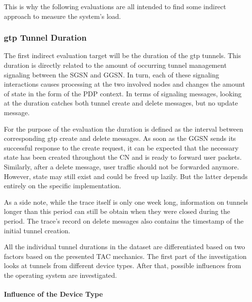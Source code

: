 This is why the following evaluations are all intended to find some indirect approach to measure the system's load.



\subsubsection{\texorpdfstring{\acrshort{gtp}}{GTP} Tunnel Duration}

The first indirect evaluation target will be the duration of the \gls{gtp} tunnels. This duration is directly related to the amount of occurring tunnel management signaling between the \gls{SGSN} and \gls{GGSN}. In turn, each of these signaling interactions causes processing at the two involved nodes and changes the amount of state in the form of the \gls{PDP} context. In terms of signaling messages, looking at the duration catches both tunnel create and delete messages, but no update message.

For the purpose of the evaluation the duration is defined as the interval between corresponding \gls{gtp} create and delete messages. As soon as the \gls{GGSN} sends its successful response to the create request, it can be expected that the necessary state has been created throughout the \gls{CN} and is ready to forward user packets. Similarly, after a delete message, user traffic should not be forwarded anymore. However, state may still exist and could be freed up lazily. But the latter depends entirely on the specific implementation.

As a side note, while the trace itself is only one week long, information on tunnels longer than this period can still be obtain when they were closed during the period. The trace's record on delete messages also contains the timestamp of the initial tunnel creation.

All the individual tunnel durations in the dataset are differentiated based on two factors based on the presented \gls{TAC} mechanics. The first part of the investigation looks at tunnels from different device types. After that, possible influences from the operating system are investigated. 


\paragraph{Influence of the Device Type}

